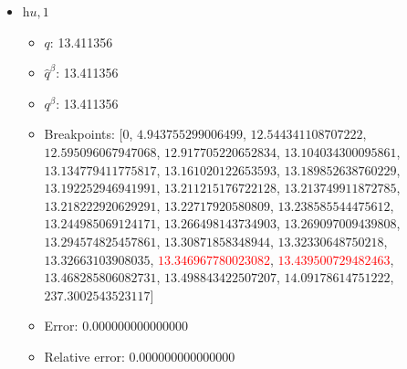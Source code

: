 \documentclass{article}%
\begin{document}
\begin{itemize}
\begin{itemize}
		\item $\hat{q}^\beta$: 38.035748%
		\item $q^\beta$: 38.035748%
		\item Breakpoints: $[$$0$, $18.023935870161154$, $21.04660840930274$, $24.97364426355679$, $30.189424467922265$, $34.23465128608717$, $36.670233878040335$, $37.21616748032837$, $37.443498367229196$, $37.47875108132638$, $37.52720514437563$, $37.554741031910254$, $37.612770977560544$, $37.65435035996605$, $37.6551299822246$, $37.682669717644174$, $37.71812813120871$, $37.76995088018704$, $37.78573239590169$, $37.821651654621526$, $37.88148462263016$, $37.9018730666985$, \textcolor{red}{$37.9454585315849$}, \textcolor{red}{$38.10872593446926$}, $38.21652191748154$, $38.224970554765775$, $38.88483572219945$, $285.4001551947793$$]$%
		\item Error: 0.000000000000000%
		\item Relative error: 0.000000000000000%
	\end{itemize}%
	\item $\textit{hu},1$%
	\begin{itemize}%
		\item $q$: 13.411356%
		\item $\hat{q}^\beta$: 13.411356%
		\item $q^\beta$: 13.411356%
		\item Breakpoints: $[$$0$, $4.943755299006499$, $12.544341108707222$, $12.595096067947068$, $12.917705220652834$, $13.104034300095861$, $13.134779411775817$, $13.161020122653593$, $13.189852638760229$, $13.192252946941991$, $13.211215176722128$, $13.213749911872785$, $13.218222920629291$, $13.22717920580809$, $13.238585544475612$, $13.244985069124171$, $13.266498143734903$, $13.269097009439808$, $13.294574825457861$, $13.30871858348944$, $13.32330648750218$, $13.32663103908035$, \textcolor{red}{$13.346967780023082$}, \textcolor{red}{$13.439500729482463$}, $13.468285806082731$, $13.498843422507207$, $14.09178614751222$, $237.3002543523117$$]$%
		\item Error: 0.000000000000000%
		\item Relative error: 0.000000000000000%
	\end{itemize}%
\end{itemize}%
\end{document}
